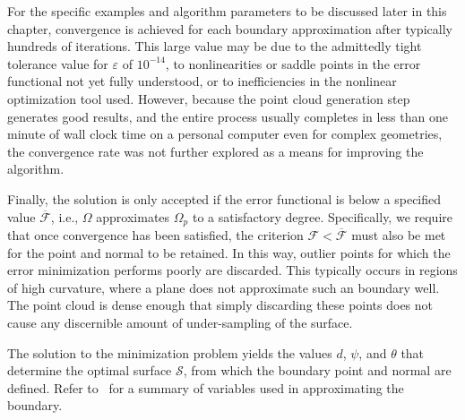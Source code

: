 For the specific examples and algorithm parameters to be discussed later in this chapter, convergence is achieved for each boundary approximation after typically hundreds of iterations. This large value may be due to the admittedly tight tolerance value for $\varepsilon$ of $10^{-14}$, to nonlinearities or saddle points in the error functional not yet fully understood, or to inefficiencies in the nonlinear optimization tool used. However, because the point cloud generation step generates good results, and the entire process usually completes in less than one minute of wall clock time on a personal computer even for complex geometries, the convergence rate was not further explored as a means for improving the algorithm.

Finally, the solution is only accepted if the error functional is below a specified value $\overline{\mathcal{F}}$, i.e., $\Omega$ approximates $\Omega_p$ to a satisfactory degree. Specifically, we require that once convergence has been satisfied, the criterion $\mathcal{F} < \overline{\mathcal{F}}$ must also be met for the point and normal to be retained. In this way, outlier points for which the error minimization performs poorly are discarded. This typically occurs in regions of high curvature, where a plane does not approximate such an boundary well. The point cloud is dense enough that simply discarding these points does not cause any discernible amount of under-sampling of the surface.

The solution to the minimization problem yields the values $d$, $\psi$, and $\theta$ that determine the optimal surface $\mathcal{S}$, from which the boundary point and normal are defined. Refer to~ for a summary of variables used in approximating the boundary.

